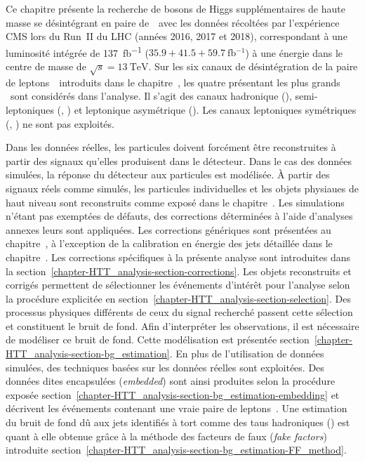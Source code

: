 Ce chapitre présente la
recherche de bosons de Higgs supplémentaires de haute masse se désintégrant en paire de~\tau\
avec les données récoltées par l'expérience CMS
lors du Run~II du LHC (années 2016, 2017 et 2018),
correspondant à une luminosité intégrée de \SI{137}{\femto\barn^{-1}} ($\num{35.9}+\num{41.5}+\SI{59.7}{\femto\barn^{-1}}$)
à une énergie dans le centre de masse de $\sqrt{s}=\SI{13}{\TeV}$.
Sur les six canaux de désintégration de la paire de leptons~\tau\ introduits dans le chapitre~,
les quatre présentant les plus grands \BR\ sont considérés dans l'analyse.
Il s'agit des canaux
hadronique (\tauh\tauh),
semi-leptoniques (\mu\tauh, \ele\tauh)
et
leptonique asymétrique (\ele\mu).
Les canaux leptoniques symétriques (\mu\mu, \ele\ele) ne sont pas exploités.
\par
Dans les données réelles, les particules doivent forcément être reconstruites à partir des signaux qu'elles produisent dans le détecteur.
Dans le cas des données simulées, la réponse du détecteur aux particules est modélisée.
À partir des signaux réels comme simulés, les particules individuelles et les objets physiaues de haut niveau sont reconstruits comme exposé dans le chapitre~.
Les simulations n'étant pas exemptées de défauts, des corrections déterminées à l'aide d'analyses annexes leurs sont appliquées.
Les corrections génériques sont présentées au chapitre~\refChLHCCMS,
à l'exception de la calibration en énergie des jets détaillée dans le chapitre~.
Les corrections spécifiques à la présente analyse sont introduites dans la section~\ref{chapter-HTT_analysis-section-corrections}.
Les objets reconstruits et corrigés permettent de sélectionner les événements d'intérêt pour l'analyse selon la procédure explicitée en section~\ref{chapter-HTT_analysis-section-selection}.
Des processus physiques différents de ceux du signal recherché passent cette sélection et constituent le bruit de fond.
Afin d'interpréter les observations, il est nécessaire de modéliser ce bruit de fond.
Cette modélisation est présentée section~\ref{chapter-HTT_analysis-section-bg_estimation}.
En plus de l'utilisation de données simulées, des techniques basées sur les données réelles sont exploitées.
Des données dites \og encapsulées \fg{} (\emph{embedded}) sont ainsi produites selon la procédure exposée section~\ref{chapter-HTT_analysis-section-bg_estimation-embedding} et décrivent les événements contenant une vraie paire de leptons~\tau.
Une estimation du bruit de fond dû aux jets identifiés à tort comme des taus hadroniques (\ftauhs) est quant à elle obtenue grâce à la méthode des facteurs de faux (\emph{fake factors}) introduite section~\ref{chapter-HTT_analysis-section-bg_estimation-FF_method}.
